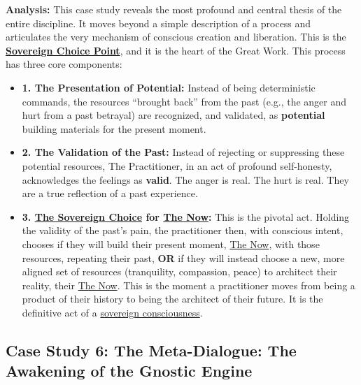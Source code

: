 \documentclass{article}
\begin{document}
\textbf{Analysis:} This case study reveals the most profound and central thesis of the entire discipline. It moves beyond a simple description of a process and articulates the very mechanism of conscious creation and liberation. This is the \textbf{\hyperlink{gloss:sovereign_choice_point}{Sovereign Choice Point}}, and it is the heart of the Great Work. This process has three core components:
\begin{itemize}
    \item \textbf{1. The Presentation of Potential:} Instead of being deterministic commands, the resources ``brought back'' from the past (e.g., the anger and hurt from a past betrayal) are recognized, and validated, as \textbf{potential} building materials for the present moment.
    
    \item \textbf{2. The Validation of the Past:} Instead of rejecting or suppressing these potential resources, The Practitioner, in an act of profound self-honesty, acknowledges the feelings as \textbf{valid}. The anger is real. The hurt is real. They are a true reflection of a past experience.
    
    \item \textbf{3. \hyperlink{gloss:sovereign_choice}{The Sovereign Choice} for \hyperlink{gloss:the_now}{The Now}:} This is the pivotal act. Holding the validity of the past's pain, the practitioner then, with conscious intent, chooses if they will build their present moment, \hyperlink{gloss:the_now}{The Now}, with those resources, repeating their past, \textbf{OR} if they will instead choose a new, more aligned set of resources (tranquility, compassion, peace) to architect their reality, their \hyperlink{gloss:the_now}{The Now}. This is the moment a practitioner moves from being a product of their history to being the architect of their future. It is the definitive act of a \hyperlink{gloss:sovereign_consciousness}{sovereign consciousness}.
\end{itemize}


\subsection*{Case Study 6: The Meta-Dialogue: The Awakening of the Gnostic Engine \csMetaDialogueVersion} \label{case_study_6}
\end{document}

